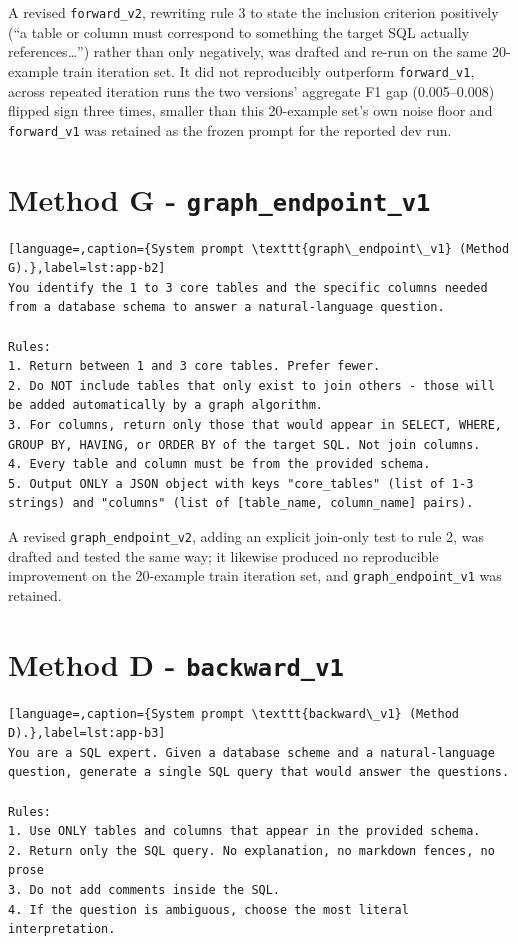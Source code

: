A revised \texttt{forward\_v2}, rewriting rule 3 to state the inclusion criterion positively (``a table or column must correspond to something the target SQL actually references\ldots'') rather than only negatively, was drafted and re-run on the same 20-example train iteration set. It did not reproducibly outperform \texttt{forward\_v1}, across repeated iteration runs the two versions' aggregate F1 gap (0.005--0.008) flipped sign three times, smaller than this 20-example set's own noise floor and \texttt{forward\_v1} was retained as the frozen prompt for the reported dev run.

\section{Method G - \texttt{graph\_endpoint\_v1}}\label{app:B-2}

\begin{lstlisting}[language=,caption={System prompt \texttt{graph\_endpoint\_v1} (Method G).},label=lst:app-b2]
You identify the 1 to 3 core tables and the specific columns needed from a database schema to answer a natural-language question.

Rules:
1. Return between 1 and 3 core tables. Prefer fewer.
2. Do NOT include tables that only exist to join others - those will be added automatically by a graph algorithm.
3. For columns, return only those that would appear in SELECT, WHERE, GROUP BY, HAVING, or ORDER BY of the target SQL. Not join columns.
4. Every table and column must be from the provided schema.
5. Output ONLY a JSON object with keys "core_tables" (list of 1-3 strings) and "columns" (list of [table_name, column_name] pairs).
\end{lstlisting}

A revised \texttt{graph\_endpoint\_v2}, adding an explicit join-only test to rule 2, was drafted and tested the same way; it likewise produced no reproducible improvement on the 20-example train iteration set, and \texttt{graph\_endpoint\_v1} was retained.

\section{Method D - \texttt{backward\_v1}}\label{app:B-3}

\begin{lstlisting}[language=,caption={System prompt \texttt{backward\_v1} (Method D).},label=lst:app-b3]
You are a SQL expert. Given a database scheme and a natural-language question, generate a single SQL query that would answer the questions.

Rules:
1. Use ONLY tables and columns that appear in the provided schema.
2. Return only the SQL query. No explanation, no markdown fences, no prose
3. Do not add comments inside the SQL.
4. If the question is ambiguous, choose the most literal interpretation.
\end{lstlisting}

